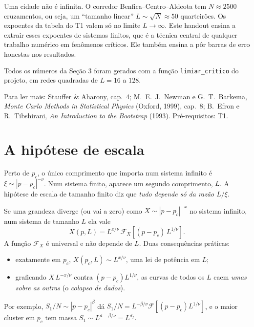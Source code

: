 \documentclass[11pt]{article}
\begin{document}
\fazertitulo

Uma cidade não é infinita. O corredor Benfica--Centro--Aldeota tem $N\approx2500$ cruzamentos, ou seja, um ``tamanho linear'' $L\sim\sqrt N\approx50$ quarteirões. Os expoentes da tabela do T1 valem só no limite $L\to\infty$. Este handout ensina a extrair esses expoentes de sistemas finitos, que é a técnica central de qualquer trabalho numérico em fenômenos críticos. Ele também ensina a pôr barras de erro honestas nos resultados.

Todos os números da Seção 3 foram gerados com a função \texttt{limiar\_critico} do projeto, em redes quadradas de $L=16$ a $128$.

Para ler mais: Stauffer \& Aharony, cap.\ 4; M.~E.~J.~Newman e G.~T.~Barkema, \emph{Monte Carlo Methods in Statistical Physics} (Oxford, 1999), cap.\ 8; B.~Efron e R.~Tibshirani, \emph{An Introduction to the Bootstrap} (1993). Pré-requisitos: T1. 

\section{A hipótese de escala}

Perto de $p_c$, o único comprimento que importa num sistema infinito é $\xi\sim|p-p_c|^{-\nu}$. Num sistema finito, aparece um segundo comprimento, $L$. A hipótese de escala de tamanho finito diz que \emph{tudo depende só da razão $L/\xi$}.

\begin{ideia}
Se uma grandeza diverge (ou vai a zero) como $X\sim|p-p_c|^{-x}$ no sistema infinito, num sistema de tamanho $L$ ela vale
\[
X(p,L) = L^{x/\nu}\,\mathcal F_X\!\left[(p-p_c)\,L^{1/\nu}\right].
\]
A função $\mathcal F_X$ é universal e não depende de $L$. Duas consequências práticas:
\begin{itemize}
  \item exatamente em $p_c$, $X(p_c,L)\sim L^{x/\nu}$, uma lei de potência em $L$;
  \item graficando $X\,L^{-x/\nu}$ contra $(p-p_c)L^{1/\nu}$, as curvas de todos os $L$ caem \emph{umas sobre as outras} (o \emph{colapso de dados}).
\end{itemize}
\end{ideia}

Por exemplo, $S_1/N\sim|p-p_c|^\beta$ dá $S_1/N = L^{-\beta/\nu}\mathcal F[(p-p_c)L^{1/\nu}]$, e o maior cluster em $p_c$ tem massa $S_1\sim L^{d-\beta/\nu} = L^{d_f}$.
\end{document}
